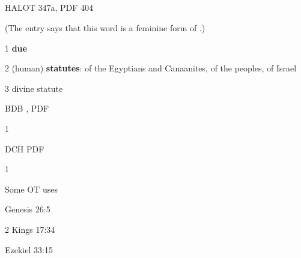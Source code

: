 			\subparagraph{\texorpdfstring{}{}} %
				\label{CHUQQAH} %
			
				\begin{compactdesc}
					\item[HALOT 347a, PDF 404] \textbf{}
						\begin{compactitem}
							\item (The entry says that this word is a feminine form of .)
							\item[1] \textbf{due}
							\item[2] (human) \textbf{statutes}: of the Egyptians and Canaanites, of the peoples, of Israel
							\item[3] divine statute
						\end{compactitem}
					\item[BDB , PDF ] \textbf{}
						\begin{compactitem}
							\item[1]
						\end{compactitem}
					\item[DCH PDF ] \textbf{}
						\begin{compactitem}
							\item[1]
						\end{compactitem}
				\end{compactdesc}
				
				\begin{compactdesc}
					\item[Some OT uses] \textbf{}
						\begin{compactdesc}
							\item[Genesis 26:5]
							\item[2 Kings 17:34]
							\item[Ezekiel 33:15] 
						\end{compactdesc}
				\end{compactdesc}
			
		
		
	
